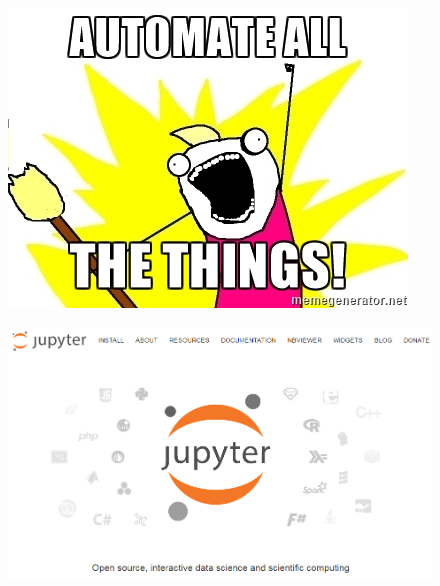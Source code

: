 \documentclass[Master.tex]{subfiles}
\begin{document}
\begin{frame}
	
	\begin{figure}
\centering
\includegraphics[width=0.99\linewidth]{images/AutomateAllTheThings}

\end{figure}

\end{frame}	
\begin{frame}
\begin{figure}
\centering
\includegraphics[width=0.99\linewidth]{images/JupyterCloud}
\caption{}
\label{fig:JupyterCloud}
\end{figure}


\end{frame}
\end{document}

